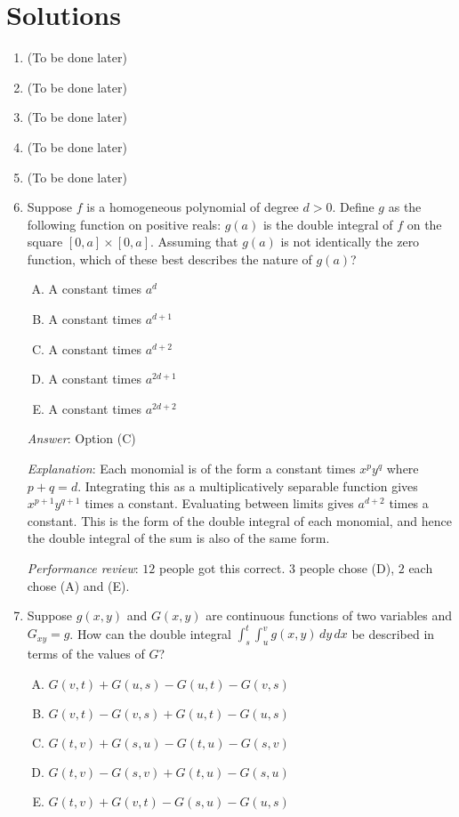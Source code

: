 \documentclass[10pt]{amsart}
\begin{document}
\section{Solutions}
\begin{enumerate}

\item (To be done later)
\item (To be done later)
\item (To be done later)
\item (To be done later)
\item (To be done later)
\item Suppose $f$ is a homogeneous polynomial of degree $d >
  0$. Define $g$ as the following function on positive reals: $g(a)$
  is the double integral of $f$ on the square $[0,a] \times
  [0,a]$. Assuming that $g(a)$ is not identically the zero function,
  which of these best describes the nature of $g(a)$?

  \begin{enumerate}[(A)]
  \item A constant times $a^d$
  \item A constant times $a^{d + 1}$
  \item A constant times $a^{d + 2}$
  \item A constant times $a^{2d + 1}$
  \item A constant times $a^{2d + 2}$
  \end{enumerate}

  {\em Answer}: Option (C)

  {\em Explanation}: Each monomial is of the form a constant times
  $x^py^q$ where $p + q = d$. Integrating this as a multiplicatively
  separable function gives $x^{p+1}y^{q+1}$ times a
  constant. Evaluating between limits gives $a^{d + 2}$ times a
  constant. This is the form of the double integral of each monomial,
  and hence the double integral of the sum is also of the same form.

  {\em Performance review}: $12$ people got this correct. $3$ people
  chose (D), $2$ each chose (A) and (E).
\item Suppose $g(x,y)$ and $G(x,y)$ are continuous functions of two
  variables and $G_{xy} = g$. How can the double integral $\int_s^t
  \int_u^v g(x,y) \, dy \, dx$ be described in terms of the values of
  $G$?

  \begin{enumerate}[(A)]
  \item $G(v,t) + G(u,s) - G(u,t) - G(v,s)$
  \item $G(v,t) - G(v,s) + G(u,t) - G(u,s)$
  \item $G(t,v) + G(s,u) - G(t,u) - G(s,v)$
  \item $G(t,v) - G(s,v) + G(t,u) - G(s,u)$
  \item $G(t,v) + G(v,t) - G(s,u) - G(u,s)$
  \end{enumerate}


\end{enumerate}
\end{document}
